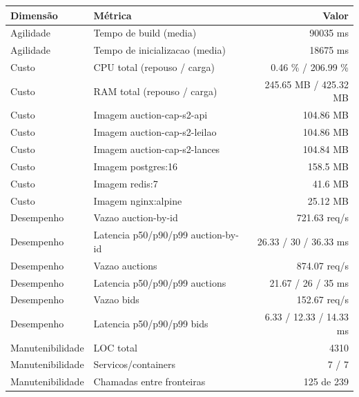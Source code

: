 \begin{quadro}[htb]
  \centering
  \caption{Métricas (auction, capacidade-negocio, snapshot-2).}
  \label{qua:metricas-auction-capacidade-negocio-snapshot-2}
  \renewcommand{\arraystretch}{1.15}
  \begin{tabular}{|l|l|r|}
    \hline
    \textbf{Dimensão} & \textbf{Métrica} & \textbf{Valor} \\
    \hline
    Agilidade & Tempo de build (media) & 90035 ms \\ \hline
    Agilidade & Tempo de inicializacao (media) & 18675 ms \\ \hline
    Custo & CPU total (repouso / carga) & 0.46 \% / 206.99 \% \\ \hline
    Custo & RAM total (repouso / carga) & 245.65 MB / 425.32 MB \\ \hline
    Custo & Imagem auction-cap-s2-api & 104.86 MB \\ \hline
    Custo & Imagem auction-cap-s2-leilao & 104.86 MB \\ \hline
    Custo & Imagem auction-cap-s2-lances & 104.84 MB \\ \hline
    Custo & Imagem postgres:16 & 158.5 MB \\ \hline
    Custo & Imagem redis:7 & 41.6 MB \\ \hline
    Custo & Imagem nginx:alpine & 25.12 MB \\ \hline
    Desempenho & Vazao auction-by-id & 721.63 req/s \\ \hline
    Desempenho & Latencia p50/p90/p99 auction-by-id & 26.33 / 30 / 36.33 ms \\ \hline
    Desempenho & Vazao auctions & 874.07 req/s \\ \hline
    Desempenho & Latencia p50/p90/p99 auctions & 21.67 / 26 / 35 ms \\ \hline
    Desempenho & Vazao bids & 152.67 req/s \\ \hline
    Desempenho & Latencia p50/p90/p99 bids & 6.33 / 12.33 / 14.33 ms \\ \hline
    Manutenibilidade & LOC total & 4310 \\ \hline
    Manutenibilidade & Servicos/containers & 7 / 7 \\ \hline
    Manutenibilidade & Chamadas entre fronteiras & 125 de 239 \\ \hline
  \end{tabular}
\end{quadro}
